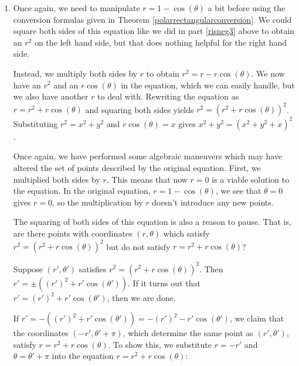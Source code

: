 \documentclass{ximera}
\begin{document}
\begin{ex}
\begin{enumerate}
\begin{enumerate}
\item  Once again, we need to manipulate   $r = 1 - \cos(\theta)$ a bit before using the conversion formulas given in Theorem \ref{polarrectangularconversion}.  We could square both sides of this equation like we did in part \ref{risneg3} above to obtain an $r^2$ on the left hand side, but that does nothing helpful for the right hand side.  

\smallskip

Instead, we multiply both sides by $r$ to obtain  $r^{2} = r - r\cos(\theta)$.  We now have an $r^2$ and an $r\cos(\theta)$ in the equation, which we can easily handle, but we also have another $r$ to deal with.  Rewriting the equation as $r = r^{2} + r\cos(\theta)$ and squaring both sides yields $r^2 = \left(r^2 + r\cos(\theta)\right)^2$.  Substituting $r^2 = x^2 + y^2$ and $r\cos(\theta) = x$ gives   $x^2 + y^2 = \left(x^2 + y^2 + x\right)^2$.  

\smallskip

Once again, we have performed some algebraic maneuvers which may have altered the set of points described by the original equation.  First, we multiplied both sides by $r$.  This means that now $r=0$ is a viable solution to the equation.  In the original equation, $r = 1 - \cos(\theta)$, we see that $\theta = 0$ gives $r=0$, so the multiplication by $r$ doesn't introduce any new points. 

\smallskip

The squaring of both sides of this equation is also a reason to pause.  That is, are there points with coordinates $(r,\theta)$ which satisfy $r^2 = \left(r^2 + r\cos(\theta)\right)^2$ but do not satisfy $r = r^2 + r\cos(\theta)$?  

\smallskip

Suppose $\left(r',\theta'\right)$ satisfies $r^2 = \left(r^2 + r\cos(\theta)\right)^2$.  Then $r' = \pm \left((r')^2 + r'\cos(\theta')\right)$.  If it turns out that $r' = (r')^2 + r'\cos(\theta')$, then we are done.  

\smallskip

If  $r' = -\left((r')^2 + r'\cos(\theta')\right) = -(r')^{2} - r'\cos(\theta')$, we claim that the coordinates $(-r', \theta' + \pi)$, which determine the same point as $(r',\theta')$, satisfy $r = r^2 + r\cos(\theta)$.  To show this, we substitute $r =  -r'$ and $\theta = \theta' + \pi$ into the equation $r = r^2 + r\cos(\theta)$:

\[ \begin{array}{rclr}


\end{array}\]
\end{enumerate}
\end{enumerate}
\end{ex}
\end{document}
